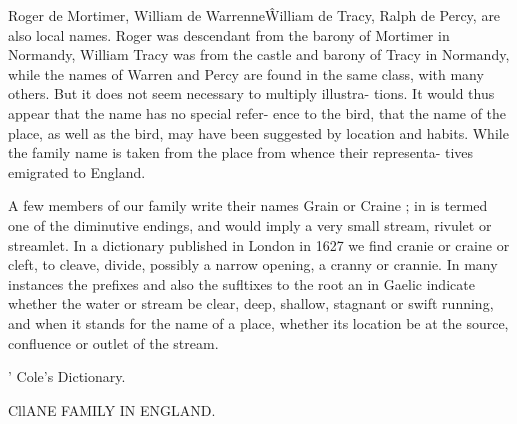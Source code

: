 Roger de Mortimer, William de Warrenne\^ William de Tracy, 
Ralph de Percy, are also local names. Roger was descendant 
from the barony of Mortimer in Normandy, William Tracy was 
from the castle and barony of Tracy in Normandy, while the 
names of Warren and Percy are found in the same class, with 
many others. But it does not seem necessary to multiply illustra- 
tions. It would thus appear that the name has no special refer- 
ence to the bird, that the name of the place, as well as the bird, 
may have been suggested by location and habits. While the 
family name is taken from the place from whence their representa- 
tives emigrated to England. 

A few members of our family write their names Grain or 
Craine ; in is termed one of the diminutive endings, and would 
imply a very small stream, rivulet or streamlet. In a dictionary 
published in London in 1627 we find cranie or craine or cleft, 
to cleave, divide, possibly a narrow opening, a cranny or crannie. 
In many instances the prefixes and also the sufltixes to the root 
an in Gaelic indicate whether the water or stream be clear, deep, 
shallow, stagnant or swift running, and when it stands for the 
name of a place, whether its location be at the source, confluence 
or outlet of the stream. 



' Cole's Dictionary. 



CllANE FAMILY IN ENGLAND. 




